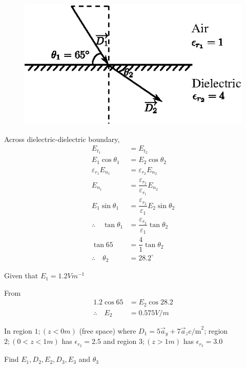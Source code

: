 \begin{solution}
~

\begin{figure}[H]
\centering
\includegraphics[scale=1.1]{images/fig5.eps}\label{chap27-fig5}
\end{figure}

Across dielectric-dielectric boundary, 
\begin{align*}
E_{t_{1}} & = E_{t_{2}}\\
E_{1} \cos \theta_{1} & = E_{2} \cos \theta_{2}\\
\varepsilon_{r_{1}}E_{n_{1}} & = \varepsilon_{r_{2}}E_{n_{2}}\\
E_{n_{1}} & = \dfrac{\varepsilon_{r_{2}}}{\varepsilon_{r_{1}}} E_{n_{2}}\\
E_{1} \sin \theta_{1} & = \dfrac{\varepsilon_{r_{2}}}{\varepsilon_{1}} E_{2} \sin \theta_{2}\\
\therefore\quad \tan \theta_{1} & = \dfrac{\varepsilon_{r_{2}}}{\varepsilon_{1}} \tan \theta_{2}\\
\tan 65 & = \dfrac{4}{1} \tan \theta_{2}\\
\therefore\quad \theta_{2} & = 28.2^{\circ}
\end{align*}

Given that $E_{1} = 1.2 Vm^{-1}$

From 
\begin{align*}
1.2\cos 65 & = E_{2} \cos 28.2\\
\therefore\quad E_{2} & = 0.575 V/m
\end{align*}
\end{solution}

\begin{problem}
In region $1 ; (z < 0m)$ (free space) where $D_{1} = 5\overrightarrow{a}_{y} + 7\overrightarrow{a}_{z} \text{c/m}^{2}$; region $2 ; (0 < z < 1m)$ has $\epsilon_{r_{2}} = 2.5$ and region $3 ; (z > 1m)$ has $\epsilon_{r_{3}} = 3.0$

Find $E_{1}, D_{2}, E_{2}, D_{3}, E_{3}$ and $\theta_{3}$
\end{problem}

